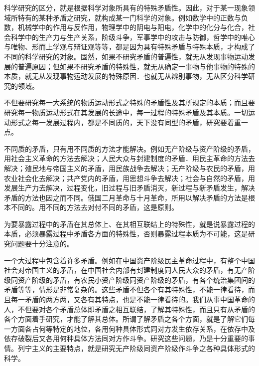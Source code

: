 \documentclass[UTF8, 12pt, a4paper]{ctexrep}
\begin{document}
科学研究的区分，就是根据科学对象所具有的特殊矛盾性。因此，对于某一现象领域所特有的某种矛盾之研究，就构成某一门科学的对象。例如数学中的正数与负数，机械学中的作用与反作用，物理学中的阴电与阳电，化学中的化分与化合，社会科学中的生产力与生产关系，阶级斗争，军事学中的攻击与防御，哲学中的唯心与唯物、形而上学观与辩证观等等，都是因为具有特殊矛盾与特殊本质，才构成了不同的科学研究的对象。固然，如果不研究矛盾的普遍性，就无从发现事物运动发展的普遍原因；但如果不研究矛盾的特殊性，就无从确定一事物与他事物的特殊的本质，就无从发现事物运动发展的特殊原因．也就无从辨别事物，无从区分科学研究的领域。

不但要研究每一大系统的物质运动形式之特殊的矛盾性及其所规定的本质；而且要研究每一物质运动形式在其发展的长途中，每一过程的特殊矛盾及其本质。一切运动形式之每一发展过程内，都是不同质的，天下没有同型的矛盾，研究要着重一点。

不同质的矛盾，只有用不同质的方法才能解决。例如无产阶级与资产阶级的矛盾，用社会主义革命的方法去解决；人民大众与封建制度的矛盾．用民主革命的方法去解决；殖民地与帝国主义的矛盾，用民族战争去解决；无产阶级与农民的矛盾，用农业社会化去解决；共产党内的矛盾，用思想斗争去解决；社会与自然的矛盾，用发展生产力去解决，过程变化，旧过程与旧矛盾消灭，新过程与新矛盾发生，解决矛盾的方法也因之而不同。俄国二月革命与十月革命，所用以解决矛盾的方法是根本不同的。用不同的方法去对付不同的矛盾，这是原则。

为要暴露过程中的矛盾在其总体上、在其相互联结上的特殊性，就是说暴露过程的本质，必须暴露过程中矛盾各方面的特殊性，否则暴露过程本质为不可能，这是研究问题要十分注意的。

一个大过程中包含着许多矛盾。例如在中国资产阶级民主革命过程中，有整个中国社会对帝国主义的矛盾，在中国社会内部有封建制度同人民大众的矛盾，有无产阶级同资产阶级的矛盾，有农民小资产阶级同资产阶级的矛盾，有各个统治集团间的矛盾等等，情形是非常复杂的。这些矛盾不但各个有其特殊性，不能一律看待，而且每一矛盾的两方两，又各有其特点，也是不能一律看待的。我们从事中国革命的人，不但要对各个矛盾总体即矛盾之相互联结，了解其特殊性，而且只有从矛盾的各个方面着手研究，才能了解其总体。所谓了解矛盾之各个方面，就是了解它们每一方面各占何等特定的地位，各用何种具体形式同对方发生依存关系，在依存中及依存破裂后又各用何种具体方法同对方作斗争。研究这些问题，乃是十分重要的事情。列宁主义的主要特点，就是研究无产阶级同资产阶级作斗争之各种具体形式的科学。
\end{document}
